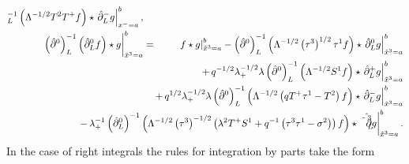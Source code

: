 \documentclass[a4paper,11pt,oneside]{article}
\begin{document}
\begin{eqnarray}
_{L}^{-1}\left( \Lambda ^{-1/2}T^{2}T^{+}f\right) \star \left. \hat{\partial}%
_{L}^{-}g\right| _{x^{-}=a}^{b},  \nonumber \\
\left. \left( \hat{\partial}^{0}\right) _{L}^{-1}\left( \hat{\partial}%
_{L}^{0}f\right) \star g\right| _{\tilde{x}^{3}=a}^{b} &=&\left. f\star
g\right| _{\tilde{x}^{3}=a}^{b}-\left( \hat{\partial}^{0}\right)
_{L}^{-1}\left( \Lambda ^{-1/2}\left( \tau ^{3}\right) ^{1/2}\tau
^{1}f\right) \star \left. \hat{\partial}_{L}^{0}g\right| _{\tilde{x}%
^{3}=a}^{b}  \nonumber \\
&&\hspace*{-3.cm}+\,q^{-1/2}\lambda _{+}^{-1/2}\lambda \left( \hat{\partial}%
^{0}\right) _{L}^{-1}\left( \Lambda ^{-1/2}S^{1}f\right) \star \left. \hat{%
\partial}_{L}^{+}g\right| _{\tilde{x}^{3}=a}^{b}  \nonumber \\
&&\hspace*{-3.cm}+\,q^{1/2}\lambda _{+}^{-1/2}\lambda \left( \hat{\partial}%
^{0}\right) _{L}^{-1}\left( \Lambda ^{-1/2}\left( qT^{+}\tau
^{1}-T^{2}\right) f\right) \star \left. \hat{\partial}_{L}^{-}g\right| _{%
\tilde{x}^{3}=a}^{b}  \nonumber \\
&&\hspace*{-3.cm}-\,\lambda _{+}^{-1}\left( \hat{\partial}_{L}^{0}\right)
^{-1}\left( \Lambda ^{-1/2}\left( \tau ^{3}\right) ^{-1/2}\left( \lambda
^{2}T^{+}S^{1}+q^{-1}\left( \tau ^{3}\tau ^{1}-\sigma ^{2}\right) \right)
f\right) \star \left. \hat{\tilde{\partial}_{L}^{3}}g\right| _{\tilde{x}%
^{3}=a}^{b}.  \nonumber
\end{eqnarray}
In the case of right integrals the rules for integration by parts take the
form 
\end{document}
